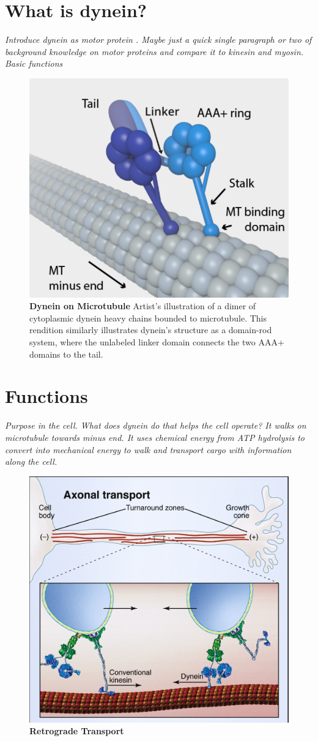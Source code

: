 \section{What is dynein?}
\textit{Introduce dynein as motor protein . Maybe just a quick single paragraph or two of background knowledge on motor proteins and compare it to kinesin and myosin. Basic functions}
\begin{figure}[H]
	\centering
	\includegraphics[width=0.6\columnwidth]{Figures/dynein_on_MT.png}
	\caption[Dynein on Microtubule]{\textbf{Dynein on Microtubule} Artist’s illustration of a dimer of cytoplasmic dynein heavy chains bounded to microtubule. This rendition similarly illustrates dynein’s structure as a domain-rod system, where the unlabeled linker domain connects the two AAA+ domains to the tail. \cite{TheTrappistArt}}
	\label{fig:final_disp}
\end{figure}


\section{Functions}
\textit{Purpose in the cell. What does dynein do that helps the cell operate? It walks on microtubule towards minus end. It uses chemical energy from ATP hydrolysis to convert into mechanical energy to walk and transport cargo with information along the cell. }

\begin{figure}[H]
	\centering
	\includegraphics[width=0.6\columnwidth]{Figures/retrograde_transport.jpg}
	\caption[Retrograde Transport]{\textbf{Retrograde Transport} \cite{Vale2003molecular}}
	\label{fig:transport}
\end{figure}



